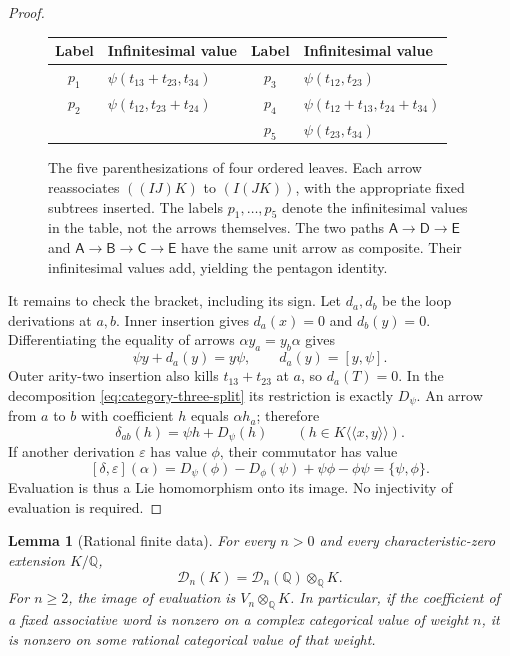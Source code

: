 \documentclass[11pt]{article}
\newcommand{\Q}{\mathbb Q}
\newtheorem{lemma}[theorem]{Lemma}
\theoremstyle{definition}
\theoremstyle{remark}
\numberwithin{equation}{section}
\begin{document}
\begin{proof}
\begin{figure}[!t]
  \smallskip
  {\small
  \begin{tabular}{@{}cl@{\qquad}cl@{}}
    \toprule
    Label & Infinitesimal value & Label & Infinitesimal value \\
    \midrule
    $p_1$ & $\psi(t_{13}+t_{23},t_{34})$
      & $p_3$ & $\psi(t_{12},t_{23})$ \\
    $p_2$ & $\psi(t_{12},t_{23}+t_{24})$
      & $p_4$ & $\psi(t_{12}+t_{13},t_{24}+t_{34})$ \\
    & & $p_5$ & $\psi(t_{23},t_{34})$ \\
    \bottomrule
  \end{tabular}}
  \caption{The five parenthesizations of four ordered leaves. Each arrow
  reassociates $((IJ)K)$ to $(I(JK))$, with the appropriate fixed subtrees
  inserted. The labels $p_1,\ldots,p_5$ denote the infinitesimal values
  in the table, not the arrows themselves.
  The two paths $\mathsf{A}\to\mathsf{D}\to\mathsf{E}$ and
  $\mathsf{A}\to\mathsf{B}\to\mathsf{C}\to\mathsf{E}$ have the same unit
  arrow as composite. Their infinitesimal values add, yielding the pentagon
  identity.}
  \label{fig:reassociation}
\end{figure}


It remains to check the bracket, including its sign.  Let $d_a,d_b$
be the loop derivations at $a,b$.  Inner insertion gives $d_a(x)=0$
and $d_b(y)=0$.  Differentiating the equality of arrows
$\alpha y_a=y_b\alpha$ gives
\[
 \psi y+d_a(y)=y\psi,
 \qquad d_a(y)=[y,\psi].
\]
Outer arity-two insertion also kills $t_{13}+t_{23}$ at $a$, so
$d_a(T)=0$.  In the decomposition
\eqref{eq:category-three-split} its restriction is exactly $D_\psi$.
An arrow from $a$ to $b$ with coefficient $h$ equals $\alpha h_a$;
therefore
\begin{equation}\label{eq:category-arrow-derivative}
 \delta_{ab}(h)=\psi h+D_\psi(h)
 \qquad(h\in K\langle\!\langle x,y\rangle\!\rangle).
\end{equation}
If another derivation $\varepsilon$ has value $\phi$, their commutator
has value
\[
 [\delta,\varepsilon](\alpha)
 =D_\psi(\phi)-D_\phi(\psi)+\psi\phi-\phi\psi
 =\{\psi,\phi\}.
\]
Evaluation is thus a Lie homomorphism onto its image.  No injectivity
of evaluation is required.
\end{proof}

\begin{lemma}[Rational finite data]\label{lem:rational-descent}
For every $n>0$ and every characteristic-zero extension $K/\Q$,
\[
 \mathcal D_n(K)=\mathcal D_n(\Q)\otimes_{\Q}K.
\]
For $n\geq2$, the image of evaluation is $V_n\otimes_{\Q}K$.
In particular, if the coefficient of a fixed associative word is
nonzero on a complex categorical value of weight $n$, it is nonzero
on some rational categorical value of that weight.
\end{lemma}
\end{document}
